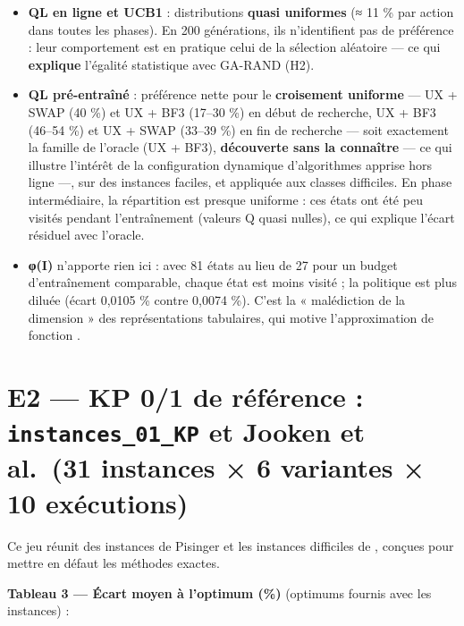 \documentclass[
  french,
  11pt,
  a4paper,
]{article}
\providecommand{\tightlist}{%
  \setlength{\itemsep}{0pt}\setlength{\parskip}{0pt}}
\begin{document}
\begin{itemize}
\tightlist
\item
  \textbf{QL en ligne et UCB1} : distributions \textbf{quasi uniformes}
  (≈ 11 \% par action dans toutes les phases). En 200 générations, ils
  n'identifient pas de préférence : leur comportement est en pratique
  celui de la sélection aléatoire --- ce qui \textbf{explique} l'égalité
  statistique avec GA-RAND (H2).
\item
  \textbf{QL pré-entraîné} : préférence nette pour le \textbf{croisement
  uniforme} --- UX + SWAP (40 \%) et UX + BF3 (17--30 \%) en début de
  recherche, UX + BF3 (46--54 \%) et UX + SWAP (33--39 \%) en fin de
  recherche --- soit exactement la famille de l'oracle (UX + BF3),
  \textbf{découverte sans la connaître} --- ce qui illustre l'intérêt de
  la configuration dynamique d'algorithmes apprise hors ligne
  \autocite{biedenkapp_2020,benjamins_2024} ---, sur des instances
  faciles, et appliquée aux classes difficiles. En phase intermédiaire,
  la répartition est presque uniforme : ces états ont été peu visités
  pendant l'entraînement (valeurs Q quasi nulles), ce qui explique
  l'écart résiduel avec l'oracle.
\item
  \textbf{φ(I)} n'apporte rien ici : avec 81 états au lieu de 27 pour un
  budget d'entraînement comparable, chaque état est moins visité ; la
  politique est plus diluée (écart 0,0105 \% contre 0,0074 \%). C'est la
  « malédiction de la dimension » des représentations tabulaires, qui
  motive l'approximation de fonction
  \autocite{sutton_barto_2018,mnih_2015}.
\end{itemize}

\section{\texorpdfstring{E2 --- KP 0/1 de référence :
\texttt{instances\_01\_KP} et Jooken et al.~(31 instances × 6 variantes
× 10
exécutions)}{E2 --- KP 0/1 de référence : instances\_01\_KP et Jooken et al.~(31 instances × 6 variantes × 10 exécutions)}}\label{analyse_resultats-e2-kp-01-de-ruxe9fuxe9rence-instances_01_kp-et-jooken-et-al.-31-instances-6-variantes-10-exuxe9cutions}

Ce jeu réunit des instances de Pisinger et les instances difficiles de
\textcite{jooken_2022}, conçues pour mettre en défaut les méthodes
exactes.

\textbf{Tableau 3 --- Écart moyen à l'optimum (\%)} (optimums fournis
avec les instances) :
\end{document}

